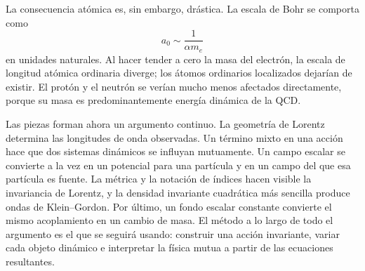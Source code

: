 \begin{classroomqa}
\end{classroomqa}

\begin{classroomqa}
\end{classroomqa}

\begin{classroomqa}
\end{classroomqa}

La consecuencia atómica es, sin embargo, drástica. La escala de Bohr se comporta como
\begin{equation}
a_0\sim\frac{1}{\alpha m_e}
\end{equation}
en unidades naturales. Al hacer tender a cero la masa del electrón, la escala de longitud atómica ordinaria diverge; los átomos ordinarios localizados dejarían de existir. El protón y el neutrón se verían mucho menos afectados directamente, porque su masa es predominantemente energía dinámica de la QCD.

Las piezas forman ahora un argumento continuo. La geometría de Lorentz determina las longitudes de onda observadas. Un término mixto en una acción hace que dos sistemas dinámicos se influyan mutuamente. Un campo escalar se convierte a la vez en un potencial para una partícula y en un campo del que esa partícula es fuente. La métrica y la notación de índices hacen visible la invariancia de Lorentz, y la densidad invariante cuadrática más sencilla produce ondas de Klein--Gordon. Por último, un fondo escalar constante convierte el mismo acoplamiento en un cambio de masa. El método a lo largo de todo el argumento es el que se seguirá usando: construir una acción invariante, variar cada objeto dinámico e interpretar la física mutua a partir de las ecuaciones resultantes.
